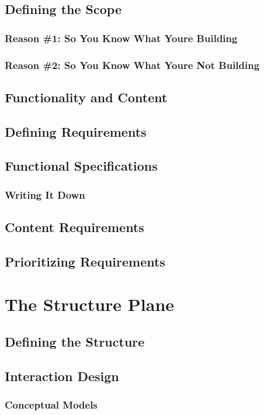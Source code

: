 \documentclass{book}
\begin{document}
        \section{Defining the Scope}
            \subsection{Reason \#1: So You Know What Youre Building}
            \subsection{Reason \#2: So You Know What Youre Not Building}
        \section{Functionality and Content}
        \section{Defining Requirements}
        \section{Functional Specifications}
            \subsection{Writing It Down}
        \section{Content Requirements}
        \section{Prioritizing Requirements}
    \chapter{The Structure Plane}
        \section{Defining the Structure}
        \section{Interaction Design}
            \subsection{Conceptual Models}
\end{document}
